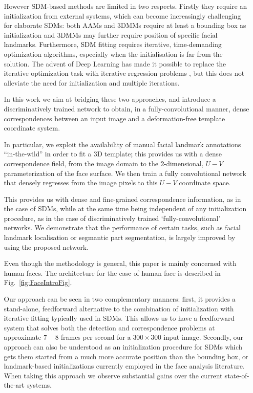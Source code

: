 \documentclass[10pt,twocolumn,letterpaper]{article}
\begin{document}
 However SDM-based methods are limited in two respects. Firstly they require an initialization from external systems, which can become increasingly challenging for elaborate SDMs: both AAMs and 3DMMs require at least a bounding box as initialization and 3DMMs may further require position of specific facial landmarks. Furthermore, SDM fitting  requires iterative, time-demanding optimization algorithms, especially when the initialisation is far from the solution. The advent of Deep Learning has made it possible to replace the iterative optimization task with iterative regression problems \cite{trigeorgis2016mnemonic}, but this does not alleviate the need for initialization and multiple iterations.

In this work we aim at bridging these two approaches, and introduce a discriminatively trained network to obtain, in a fully-convolutional manner, dense correspondences between an input image and a deformation-free template coordinate system. 

In particular, we exploit the availability of manual facial landmark annotations ``in-the-wild'' in order to fit a 3D template; this provides us with a dense correspondence field, from the image domain to the 2-dimensional, $U-V$ parameterization of the face surface. We then train a fully convolutional network that densely regresses from the image pixels to this $U-V$ coordinate space.

This provides us with dense and fine-grained correspondence information, as in the case of SDMs, while at the same time being independent of any initialization procedure, as in the case of discriminatively trained `fully-convolutional' networks. We demonstrate that the performance of certain tasks, such as facial landmark localisation or segmantic part segmentation, is largely improved by using the proposed network. 

Even though the methodology is general, this paper is mainly concerned with human faces.
The architecture for the case of human face is described in  Fig.~\ref{fig:FaceIntroFig}.

Our approach can be seen in two complementary manners: first, it provides a stand-alone, feedforward alternative to the combination of initialization with iterative fitting typically used in SDMs. This allows us to have a feedforward system that solves both the detection and correspondence problems at approximate $7-8$ frames per second for a $300\times300$ input image.
Secondly, our approach can also be understood as an initialization procedure for SDMs which gets them started from a much more accurate position than the bounding box, or landmark-based initializations currently employed in the face analysis literature. When taking this approach we observe substantial gains over the current state-of-the-art systems. 
\end{document}
